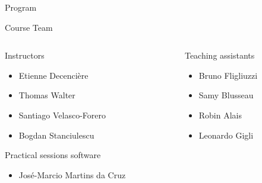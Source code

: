 \documentclass[xcolor=pdftex,dvipsnames,table,mathserif]{beamer}
\begin{document}
\begin{frame}{Program}
\end{frame}


\begin{frame}{Course Team}

  {\scriptsize

\begin{columns}
  \begin{column}{.5\textwidth}

    \begin{block}{Instructors}
      \begin{itemize}
      \item Etienne Decencière
      \item Thomas Walter
      \item Santiago Velasco-Forero
      \item Bogdan Stanciulescu
      \end{itemize}
    \end{block}

    \begin{block}{Practical sessions software}
      \begin{itemize}
      \item José-Marcio Martins da Cruz
      \end{itemize}
    \end{block}

  \end{column}

  \begin{column}{.5\textwidth}
    \begin{block}{Teaching assistants}
      \begin{itemize}
      \item Bruno Fligliuzzi
      \item Samy Blusseau
      \item Robin Alais
      \item Leonardo Gigli
      \end{itemize}
    \end{block}

  \end{column}
\end{columns}


    }

\end{frame}
\end{document}

